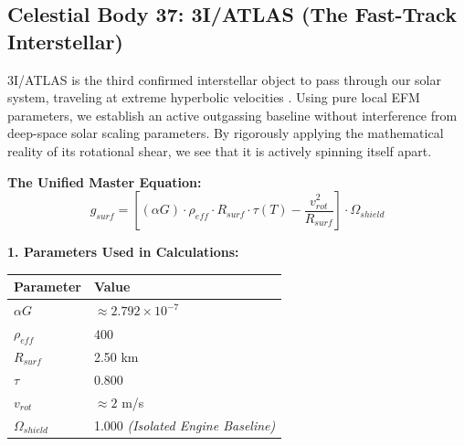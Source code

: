 \documentclass[11pt, a4paper]{article}
\begin{document}
\clearpage
\subsection{Celestial Body 37: 3I/ATLAS (The Fast-Track Interstellar)}
  3I/ATLAS is the third confirmed interstellar object to pass through our solar system, traveling at extreme hyperbolic velocities \cite{belyakov2026}. Using pure local EFM parameters, we establish an active outgassing baseline without interference from deep-space solar scaling parameters. By rigorously applying the mathematical reality of its rotational shear, we see that it is actively spinning itself apart.

  \vspace{0.5em}
  \noindent \textbf{The Unified Master Equation:}
  $$ g_{surf} = \left[ (\alpha G) \cdot \rho_{eff} \cdot R_{surf} \cdot \tau(T) - \frac{v_{rot}^2}{R_{surf}} \right] \cdot \Omega_{shield} $$

  \vspace{0.5em}
  \noindent \textbf{1. Parameters Used in Calculations:} \\[0.5em]
  \begingroup
  \renewcommand{\arraystretch}{1.3}
  \hspace*{2em}
  \begin{tabular}{|l|l|}
    \hline
    \textbf{Parameter} & \textbf{Value} \\ \hline
    $\alpha G$ & $\approx 2.792 \times 10^{-7}$ \\ \hline
    $\rho_{eff}$ & 400 \\ \hline
    $R_{surf}$ & 2.50 km \\ \hline
    $\tau$ & 0.800 \\ \hline
    $v_{rot}$ & $\approx 2$ m/s \\ \hline
    $\Omega_{shield}$ & 1.000 \textit{(Isolated Engine Baseline)} \\ \hline
  \end{tabular}
  \endgroup
\end{document}
